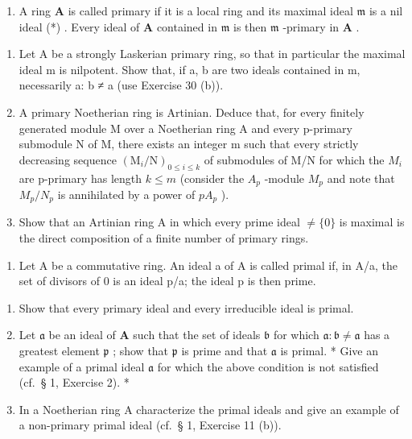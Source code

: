\begin{enumerate}
\def\labelenumi{\arabic{enumi}.}
\setcounter{enumi}{31}
\tightlist
\item
  A ring \(\mathbf{A}\) is called primary if it is a local ring and its maximal ideal \(\mathfrak{m}\) is a nil ideal (*) . Every ideal of \(\mathbf{A}\) contained in \(\mathfrak{m}\) is then \(\mathfrak{m}\) -primary in \(\mathbf{A}\) .
\end{enumerate}

\begin{enumerate}
\def\labelenumi{(\alph{enumi})}
\item
  Let A be a strongly Laskerian primary ring, so that in particular the maximal ideal m is nilpotent. Show that, if a, b are two ideals contained in m, necessarily a: b ≠ a (use Exercise 30 (b)).
\item
  A primary Noetherian ring is Artinian. Deduce that, for every finitely generated module M over a Noetherian ring A and every p-primary submodule N of M, there exists an integer m such that every strictly decreasing sequence \((\mathrm{M}_{i}/\mathrm{N})_{0\leqslant i\leqslant k}\) of submodules of M/N for which the \(M_{i}\) are p-primary has length \(k\leqslant m\) (consider the \(A_{p}\) -module \(M_{p}\) and note that \(M_{p}/N_{p}\) is annihilated by a power of \(pA_{p}\) ).
\item
  Show that an Artinian ring A in which every prime ideal \(\neq\{0\}\) is maximal is the direct composition of a finite number of primary rings.
\end{enumerate}

\begin{enumerate}
\def\labelenumi{\arabic{enumi}.}
\setcounter{enumi}{32}
\tightlist
\item
  Let A be a commutative ring. An ideal a of A is called primal if, in A/a, the set of divisors of 0 is an ideal p/a; the ideal p is then prime.
\end{enumerate}

\begin{enumerate}
\def\labelenumi{(\alph{enumi})}
\item
  Show that every primary ideal and every irreducible ideal is primal.
\item
  Let \(\mathfrak{a}\) be an ideal of \(\mathbf{A}\) such that the set of ideals \(\mathfrak{b}\) for which \(\mathfrak{a}: \mathfrak{b} \neq \mathfrak{a}\) has a greatest element \(\mathfrak{p}\) ; show that \(\mathfrak{p}\) is prime and that \(\mathfrak{a}\) is primal. * Give an example of a primal ideal \(\mathfrak{a}\) for which the above condition is not satisfied (cf.~§ 1, Exercise 2). *
\item
  In a Noetherian ring A characterize the primal ideals and give an example of a non-primary primal ideal (cf.~§ 1, Exercise 11 (b)).
\end{enumerate}

